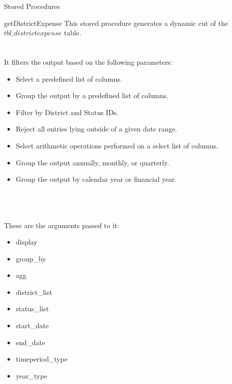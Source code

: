 \documentclass[
10pt, %
a4paper, %
oneside, %
headinclude,footinclude, %
BCOR5mm, %
]{scrartcl}
\begin{document}
\begin{section}{Stored Procedures}
\begin{subsection}{getDistrictExpense}
This stored procedure generates a dynamic cut of the $tbl\_districtexpense$ table. \\ \\ \\
It filters the output based on the following parameters: 
\begin{itemize}
        \item Select a predefined list of columns.
        \item Group the output by a predefined list of columns.
        \item Filter by District and Status IDs.
        \item Reject all entries lying outside of a given date range.
        \item Select arithmetic operations performed on a select list of columns.
        \item Group the output annually, monthly, or quarterly.
        \item Group the output by calendar year or financial year.
\end{itemize} 
\\ \\ \\
These are the arguments passed to it: 
\begin{itemize}
        \item display
        \item group\_by
        \item agg
        \item district\_list
        \item status\_list
        \item start\_date
        \item end\_date
        \item timeperiod\_type
        \item year\_type
\end{itemize}

\end{subsection}




\end{section}

\newpage
\end{document}
